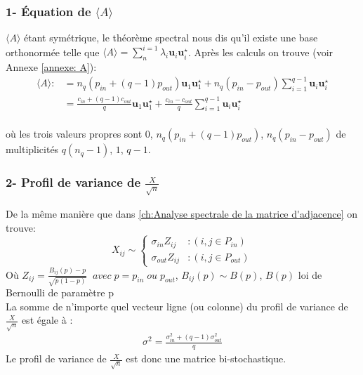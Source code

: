 \subsubsection*{1- Équation de $\langle A \rangle$}
$\langle A \rangle$ étant symétrique, le théorème spectral nous dis qu'il existe une base orthonormée telle que $\langle A \rangle = \sum_{n}^{i=1}\lambda_i\mathbf{u}_i\mathbf{u}_i^{\star}$.
Après les calculs on trouve (voir Annexe \ref{annexe: A}):
\begin{align}\label{eq: A generalize}
\langle A \rangle :&= n_q(p_{in} + (q-1)p_{out}) \mathbf{u}_1\mathbf{u}_1^{\star} + n_q(p_{in}-p_{out})\sum_{i=1}^{q-1}\mathbf{u}_i\mathbf{u}_i^{\star}\\
				   &= \frac{c_{in} + (q-1)c_{out}}{q} \mathbf{u}_1\mathbf{u}_1^{\star} + \frac{c_{in}-c_{out}}{q}\sum_{i=1}^{q-1}\mathbf{u}_i\mathbf{u}_i^{\star}
\end{align}\\
où les trois valeurs propres sont $0$, $n_q(p_{in} + (q-1)p_{out})$, $n_q(p_{in}-p_{out})$ de multiplicités $q(n_q - 1)$, $1$, $q-1$.\\

\subsubsection*{2- Profil de variance de $\frac{X}{\sqrt{n}}$}
De la même manière que dans \autoref{ch:Analyse spectrale de la matrice d'adjacence} on trouve:
\begin{equation}
	X_{ij} \sim \left\{
	\begin{array}{lr}
		\sigma_{in} Z_{ij} & : (i,j \in P_{in}) \\
		\sigma_{out} Z_{ij} & : (i,j \in P_{out})
	\end{array}
\right.\nonumber
\end{equation}
Où $Z_{ij} = \frac{B_{ij}(p) - p}{\sqrt{p(1-p)}} \;\;avec \; p = p_{in} \; ou \; p_{out}$, $B_{ij}(p) \sim B(p)$, $B(p)$ loi de Bernoulli de paramètre p\\
La somme de n'importe quel vecteur ligne (ou colonne) du profil de variance de $\frac{X}{\sqrt{n}}$ est égale à : 
\begin{align}
\label{eq:sigma2} 
\sigma^2 = \frac{\sigma_{in}^2 + (q-1)\sigma_{out}^2}{q}
\end{align}
Le profil de variance de $\frac{X}{\sqrt{n}}$ est donc une matrice bi-stochastique.\\
